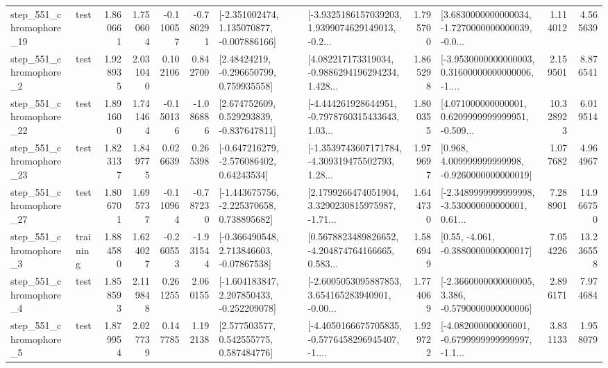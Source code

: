 \begin{tabular}{llrrrrllrlrr}
  step\_551\_chromophore\_19 &      test &      1.860661 &    1.750604 &     -0.110057 & -0.780291 &   [-2.351002474, 1.135070877, -0.007886166] &  [-3.9325186157039203, 1.9399074629149013, -0.2... &       1.795700 &  [3.6830000000000034, -1.7270000000000039, -0.0... &            1.114012 &          4.565639 \\
   step\_551\_chromophore\_2 &      test &      1.928935 &    2.031040 &      0.102106 &  0.842700 &     [2.48424219, -0.296650799, 0.759935558] &  [4.082217173319034, -0.9886294196294234, 1.428... &       1.865298 &  [-3.9530000000000003, 0.31600000000000006, -1.... &            2.159501 &          8.876541 \\
  step\_551\_chromophore\_22 &      test &      1.891600 &    1.741464 &     -0.150136 & -1.086886 &    [2.674752609, 0.529293839, -0.837647811] &  [-4.444261928644951, -0.7978760315433643, 1.03... &       1.800355 &  [4.071000000000001, 0.6209999999999951, -0.509... &           10.328923 &          6.019514 \\
  step\_551\_chromophore\_23 &      test &      1.823137 &    1.849775 &      0.026639 &  0.265398 &    [-0.647216279, -2.576086402, 0.64243534] &  [-1.3539743607171784, -4.309319475502793, 1.28... &       1.979697 &    [0.968, 4.009999999999998, -0.9260000000000019] &            1.077682 &          4.964967 \\
  step\_551\_chromophore\_27 &      test &      1.806701 &    1.695737 &     -0.110964 & -0.787230 &   [-1.443675756, -2.225370658, 0.738895682] &  [2.1799266474051904, 3.3290230815975987, -1.71... &       1.644730 &  [-2.3489999999999998, -3.530000000000001, 0.61... &            7.288901 &         14.966750 \\
   step\_551\_chromophore\_3 &  training &      1.884580 &    1.624027 &     -0.260553 & -1.931544 &    [-0.366490548, 2.713846603, -0.07867538] &  [0.5678823489826652, -4.204874764166665, 0.583... &       1.586949 &                [0.55, -4.061, -0.3880000000000017] &            7.054226 &         13.236558 \\
   step\_551\_chromophore\_4 &      test &      1.858593 &    2.119848 &      0.261255 &  2.060155 &   [-1.604183847, 2.207850433, -0.252209078] &  [-2.6005053095887853, 3.654165283940901, -0.00... &       1.774069 &  [-2.3660000000000005, 3.386, -0.5790000000000006] &            2.896171 &          7.974684 \\
   step\_551\_chromophore\_5 &      test &      1.879954 &    2.027739 &      0.147785 &  1.192138 &     [2.577503577, 0.542555775, 0.587484776] &  [-4.4050166675705835, -0.5776458296945407, -1.... &       1.929722 &  [-4.082000000000001, -0.6799999999999997, -1.1... &            3.831133 &          1.958079 \\

\end{tabular}
